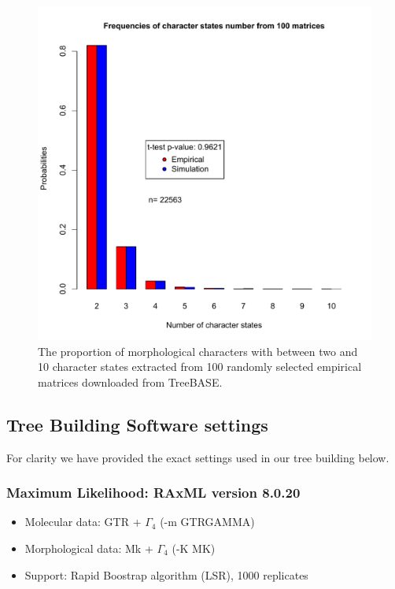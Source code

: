 \begin{figure}
\centering
\includegraphics[keepaspectratio=true]{Figures/Supplementary/TEM_Fig-AppendixCharacters.pdf}
\caption{The proportion of morphological characters with between two and 10 character states extracted from 100 randomly selected empirical matrices downloaded from TreeBASE.}
\label{Fig_AppendixCharacters}
\end{figure}

\newpage
\subsection{Tree Building Software settings}

For clarity we have provided the exact settings used in our tree building below.

\subsubsection{Maximum Likelihood: RAxML version 8.0.20 \citep{Stamatakis21012014}}

\begin{itemize}
  \item Molecular data: GTR + $\Gamma_4$ (-m GTRGAMMA)
  \item Morphological data: Mk + $\Gamma_4$ (-K MK)
  \item Support: Rapid Boostrap algorithm (LSR), 1000 replicates
\end{itemize}

